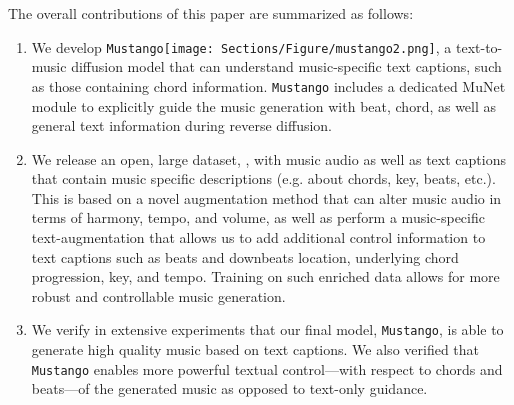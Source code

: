 \documentclass[11pt]{article}
\newcommand{\model}{\texttt{Mustango}}
\newcommand{\modelemoji}{\model{}\texttt{[image: Sections/Figure/mustango2.png]}}
\begin{document}
The overall contributions of this paper are summarized as follows:
\begin{enumerate}[itemsep=0pt, leftmargin=*, wide, labelwidth=0pt, labelindent=0pt, parsep=0pt]
\item We develop \modelemoji{}, a text-to-music diffusion model that can understand music-specific text captions, such as those containing chord information. \model{} includes a dedicated MuNet module to explicitly guide the music generation with beat, chord, as well as general text information during reverse diffusion. 
  \item We release an open, large dataset, \dataset{}, with music audio as well as text captions that contain music specific descriptions (e.g. about chords, key, beats, etc.). This is based on a novel augmentation method that can alter music audio in terms of harmony, tempo, and volume, as well as perform a music-specific text-augmentation that allows us to add additional control information to text captions such as beats and downbeats location, underlying chord progression, key, and tempo. Training on such enriched data allows for more robust and controllable music generation. 
\item We verify in extensive experiments that our final model, \model{}, is able to generate high quality music based on text captions. We also verified that \model{} enables more powerful textual control---with respect to chords and beats---of the generated music as opposed to text-only guidance.
\end{enumerate}
\end{document}
